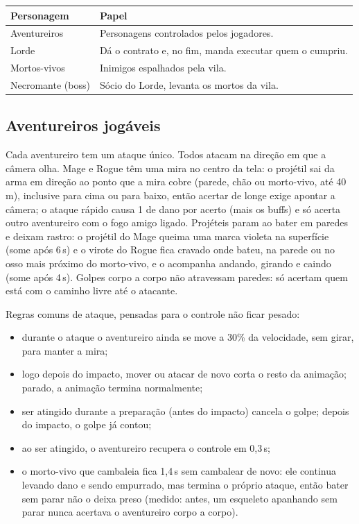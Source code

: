 \documentclass[11pt,a4paper]{article}
\begin{document}
\begin{xltabular}{\textwidth}{@{}lX@{}}
\toprule
\textbf{Personagem} & \textbf{Papel} \\
\midrule
Aventureiros & Personagens controlados pelos jogadores. \\
Lorde & Dá o contrato e, no fim, manda executar quem o cumpriu. \\
Mortos-vivos & Inimigos espalhados pela vila. \\
Necromante (boss) & Sócio do Lorde, levanta os mortos da vila. \\
\bottomrule
\end{xltabular}

\subsection{Aventureiros jogáveis}

Cada aventureiro tem um ataque único. Todos atacam na direção em que a câmera olha. Mage e Rogue têm uma mira no centro da tela: o projétil sai da arma em direção ao ponto que a mira cobre (parede, chão ou morto-vivo, até 40\,m), inclusive para cima ou para baixo, então acertar de longe exige apontar a câmera; o ataque rápido causa 1 de dano por acerto (mais os buffs) e só acerta outro aventureiro com o fogo amigo ligado. Projéteis param ao bater em paredes e deixam rastro: o projétil do Mage queima uma marca violeta na superfície (some após 6\,s) e o virote do Rogue fica cravado onde bateu, na parede ou no osso mais próximo do morto-vivo, e o acompanha andando, girando e caindo (some após 4\,s). Golpes corpo a corpo não atravessam paredes: só acertam quem está com o caminho livre até o atacante.

Regras comuns de ataque, pensadas para o controle não ficar pesado:
\begin{itemize}
    \item durante o ataque o aventureiro ainda se move a 30\% da velocidade, sem girar, para manter a mira;
    \item logo depois do impacto, mover ou atacar de novo corta o resto da animação; parado, a animação termina normalmente;
    \item ser atingido durante a preparação (antes do impacto) cancela o golpe; depois do impacto, o golpe já contou;
    \item ao ser atingido, o aventureiro recupera o controle em 0,3\,s;
    \item o morto-vivo que cambaleia fica 1,4\,s sem cambalear de novo: ele continua levando dano e sendo empurrado, mas termina o próprio ataque, então bater sem parar não o deixa preso (medido: antes, um esqueleto apanhando sem parar nunca acertava o aventureiro corpo a corpo).
\end{itemize}
\end{document}

